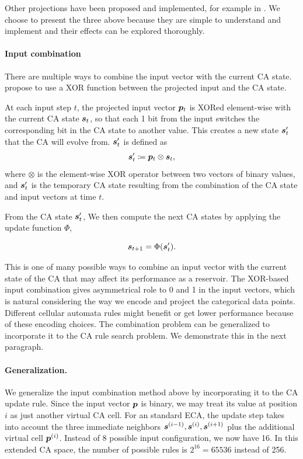 Other projections have been proposed and implemented, for example in
\parencite{yilmazReservoirComputingUsing2014}. We choose to present the three
above because they are simple to understand and implement and their effects can
be explored thoroughly.

\paragraph{Input combination}
There are multiple ways to combine the input vector with the current \ac{CA}
state. \textcite{gloverDynamicalLandscapeReservoir2021} propose to use a XOR
function between the projected input and the \ac{CA} state.

At each input step $t$, the projected input vector ${\bm{p}}_{t}$ is XORed
element-wise with the current CA state ${\bm{s}}_{t}$, so that each 1 bit from the
input switches the corresponding bit in the CA state to another value. This
creates a new state ${\bm{s}}_{t}'$ that the CA will evolve from. ${\bm{s}}_{t}'$ is
defined as
\begin{align}
  {\bm{s}}_{t}' \coloneqq {\bm{p}}_{t} \otimes {\bm{s}}_{t},
\end{align}
where $\otimes$ is the element-wise XOR operator between two vectors of binary
values, and ${\bm{s}}'_{t}$ is the temporary CA state resulting from the combination
of the CA state and input vectors at time $t$.

From the \ac{CA} state ${\bm{s}}'_{t}$, We then compute the next CA states by
applying the update function $\Phi$,

\begin{equation}
  \label{eq:ca-state}
  {\bm{s}}_{t + 1} = \Phi({\bm{s}}'_{t}).
\end{equation}

This is one of many possible ways to combine an input vector with the current
state of the CA that may affect its performance as a reservoir. The XOR-based
input combination gives asymmetrical role to 0 and 1 in the input vectors, which
is natural considering the way we encode and project the categorical data
points. Different cellular automata rules might benefit or get lower performance
because of these encoding choices. The combination problem can be generalized to
incorporate it to the \ac{CA} rule search problem. We demonstrate this in the
next paragraph.

\paragraph{Generalization.} We generalize the input combination method above by
incorporating it to the \ac{CA} update rule. Since the input vector ${\bm{p}}$ is
binary, we may treat its value at position $i$ as just another virtual \ac{CA}
cell. For an standard \ac{ECA}, the update step takes into account the three
immediate neighbors ${\bm{s}}^{(i - 1)}, {\bm{s}}^{(i)}, {\bm{s}}^{(i + 1)}$ plus the additional
virtual cell ${\bm{p}}^{(i)}$. Instead of 8 possible input configuration, we now have
16. In this extended \ac{CA} space, the number of possible rules is
$2^{16} = 65536$ instead of 256.

